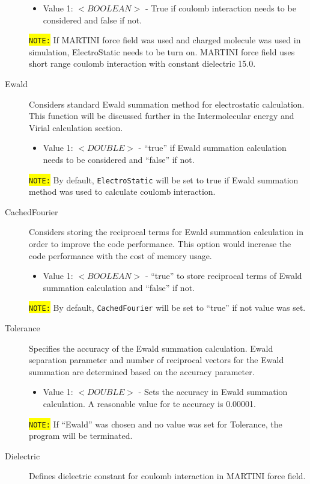 \begin{description}
	\begin{itemize}
	\item Value 1: $<BOOLEAN>$ - True if coulomb interaction needs to be considered and false if not.
	\end{itemize}
	\colorbox{yellow}{\texttt{NOTE:}} If MARTINI force field was used and charged molecule was used in simulation, ElectroStatic needs to be turn on. MARTINI force field uses short range coulomb interaction with constant dielectric 15.0.
\item [Ewald] Considers standard Ewald summation method for electrostatic calculation. This function will be discussed further in the Intermolecular energy and Virial calculation section.
	\begin{itemize}
	\item Value 1: $<DOUBLE>$ - ``true'' if Ewald summation calculation needs to be considered and ``false'' if not.
	\end{itemize}
	\colorbox{yellow}{\texttt{NOTE:}} By default, \texttt{ElectroStatic} will be set to true if Ewald summation method was used to calculate coulomb interaction.
\item [CachedFourier] Considers storing the reciprocal terms for Ewald summation calculation in order to improve the code performance. This option would increase the code performance with the cost of memory usage.
	\begin{itemize}
	\item Value 1: $<BOOLEAN>$ - ``true'' to store reciprocal terms of Ewald summation calculation and ``false'' if not.
	\end{itemize}
	\colorbox{yellow}{\texttt{NOTE:}} By default, \texttt{CachedFourier} will be set to ``true'' if not value was set.
\item [Tolerance] Specifies the accuracy of the Ewald summation calculation. Ewald separation parameter and number of reciprocal vectors for the Ewald summation are determined based on the accuracy parameter.
	\begin{itemize}
	\item Value 1: $<DOUBLE>$ - Sets the accuracy in Ewald summation calculation. A reasonable value for te accuracy is 0.00001.
	\end{itemize}
	\colorbox{yellow}{\texttt{NOTE:}} If ``Ewald'' was chosen and no value was set for Tolerance, the program will be terminated.
\item [Dielectric] Defines dielectric constant for coulomb interaction in MARTINI force field.
	\begin{itemize}

\end{itemize}
\end{description}
